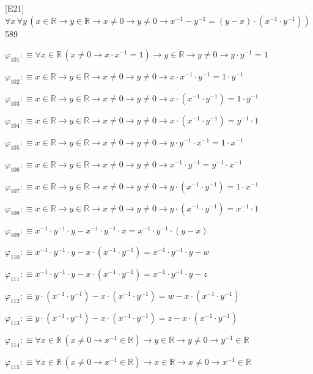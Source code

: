 \begin{fullproof}{[E21]}{$\forall x\,\forall y\,(x \in \mathbb{R} \to y \in \mathbb{R} \to x \neq 0 \to y \neq 0 \to x^{-1} - y^{-1} = (y - x) \cdot (x^{-1} \cdot y^{-1}))$}{589}
\begin{abbrevlist}
\item $\varphi_{101} :\equiv \forall x \in \mathbb{R}\,(x \neq 0 \to x \cdot x^{-1} = 1) \to y \in \mathbb{R} \to y \neq 0 \to y \cdot y^{-1} = 1$
\item $\varphi_{102} :\equiv x \in \mathbb{R} \to y \in \mathbb{R} \to x \neq 0 \to y \neq 0 \to x \cdot x^{-1} \cdot y^{-1} = 1 \cdot y^{-1}$
\item $\varphi_{103} :\equiv x \in \mathbb{R} \to y \in \mathbb{R} \to x \neq 0 \to y \neq 0 \to x \cdot (x^{-1} \cdot y^{-1}) = 1 \cdot y^{-1}$
\item $\varphi_{104} :\equiv x \in \mathbb{R} \to y \in \mathbb{R} \to x \neq 0 \to y \neq 0 \to x \cdot (x^{-1} \cdot y^{-1}) = y^{-1} \cdot 1$
\item $\varphi_{105} :\equiv x \in \mathbb{R} \to y \in \mathbb{R} \to x \neq 0 \to y \neq 0 \to y \cdot y^{-1} \cdot x^{-1} = 1 \cdot x^{-1}$
\item $\varphi_{106} :\equiv x \in \mathbb{R} \to y \in \mathbb{R} \to x \neq 0 \to y \neq 0 \to x^{-1} \cdot y^{-1} = y^{-1} \cdot x^{-1}$
\item $\varphi_{107} :\equiv x \in \mathbb{R} \to y \in \mathbb{R} \to x \neq 0 \to y \neq 0 \to y \cdot (x^{-1} \cdot y^{-1}) = 1 \cdot x^{-1}$
\item $\varphi_{108} :\equiv x \in \mathbb{R} \to y \in \mathbb{R} \to x \neq 0 \to y \neq 0 \to y \cdot (x^{-1} \cdot y^{-1}) = x^{-1} \cdot 1$
\item $\varphi_{109} :\equiv x^{-1} \cdot y^{-1} \cdot y - x^{-1} \cdot y^{-1} \cdot x = x^{-1} \cdot y^{-1} \cdot (y - x)$
\item $\varphi_{110} :\equiv x^{-1} \cdot y^{-1} \cdot y - x \cdot (x^{-1} \cdot y^{-1}) = x^{-1} \cdot y^{-1} \cdot y - w$
\item $\varphi_{111} :\equiv x^{-1} \cdot y^{-1} \cdot y - x \cdot (x^{-1} \cdot y^{-1}) = x^{-1} \cdot y^{-1} \cdot y - z$
\item $\varphi_{112} :\equiv y \cdot (x^{-1} \cdot y^{-1}) - x \cdot (x^{-1} \cdot y^{-1}) = w - x \cdot (x^{-1} \cdot y^{-1})$
\item $\varphi_{113} :\equiv y \cdot (x^{-1} \cdot y^{-1}) - x \cdot (x^{-1} \cdot y^{-1}) = z - x \cdot (x^{-1} \cdot y^{-1})$
\item $\varphi_{114} :\equiv \forall x \in \mathbb{R}\,(x \neq 0 \to x^{-1} \in \mathbb{R}) \to y \in \mathbb{R} \to y \neq 0 \to y^{-1} \in \mathbb{R}$
\item $\varphi_{115} :\equiv \forall x \in \mathbb{R}\,(x \neq 0 \to x^{-1} \in \mathbb{R}) \to x \in \mathbb{R} \to x \neq 0 \to x^{-1} \in \mathbb{R}$

\end{abbrevlist}
\end{fullproof}
